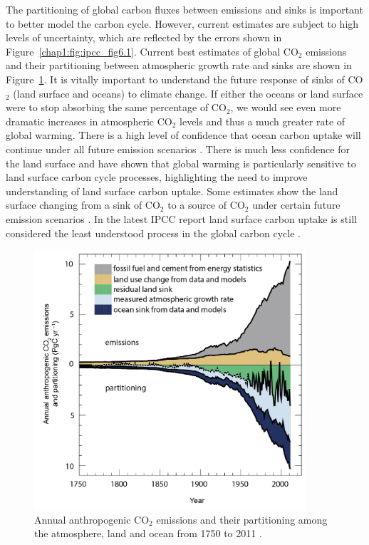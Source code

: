 The partitioning of global carbon fluxes between emissions and sinks is important to better model the carbon cycle. However, current estimates are subject to high levels of uncertainty, which are reflected by the errors shown in Figure~\ref{chap1:fig:ipcc_fig6.1}. Current best estimates of global CO\(_{2}\) emissions and their partitioning between atmospheric growth rate and sinks are shown in Figure~\ref{chap1:fig:ipcc_fig6.8}. It is vitally important to understand the future response of sinks of CO\(_{2}\) (land surface and oceans) to climate change. If either the oceans or land surface were to stop absorbing the same percentage of CO\(_{2}\), we would see even more dramatic increases in atmospheric CO\(_{2}\) levels and thus a much greater rate of global warming. There is a high level of confidence that ocean carbon uptake will continue under all future emission scenarios \citep{ciais2014carbon}. There is much less confidence for the land surface and \citet{1748-9326-7-2-024002} have shown that global warming is particularly sensitive to land surface carbon cycle processes, highlighting the need to improve understanding of land surface carbon uptake. Some estimates show the land surface changing from a sink of CO\(_{2}\) to a source of CO\(_{2}\) under certain future emission scenarios \citep{sitch2008evaluation, cox2000, scholze2006climate}. In the latest IPCC report land surface carbon uptake is still considered the least understood process in the global carbon cycle \citep{ciais2014carbon}.

\begin{figure}[ht]
    \centering
    \includegraphics[width=0.9\textwidth]{chapter/chapter1/ipcc_fig6_8.jpg}
    \caption{Annual anthropogenic CO\(_{2}\) emissions and their partitioning among the atmosphere, land and ocean from 1750 to 2011  \citep{ciais2014carbon}.}
    \label{chap1:fig:ipcc_fig6.8}
\end{figure}

